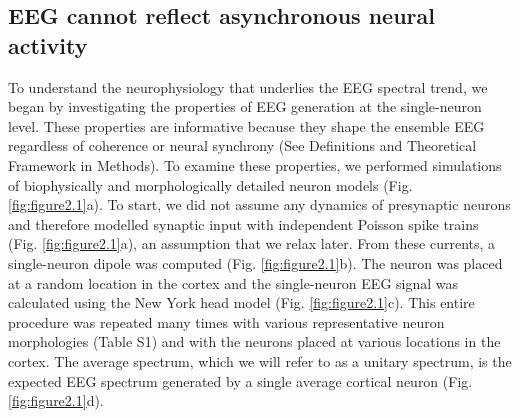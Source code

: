 \subsection{EEG cannot reflect asynchronous neural activity}
To understand the neurophysiology that underlies the EEG spectral trend, we began by investigating the properties of EEG generation at the single-neuron level. These properties are informative because they shape the ensemble EEG regardless of coherence or neural synchrony (See Definitions and Theoretical Framework in Methods). To examine these properties, we performed simulations of biophysically and morphologically detailed neuron models (Fig. \ref{fig:figure2.1}a). To start, we did not assume any dynamics of presynaptic neurons and therefore modelled synaptic input with independent Poisson spike trains (Fig. \ref{fig:figure2.1}a), an assumption that we relax later. From these currents, a single-neuron dipole was computed\cite{Næss2021} (Fig. \ref{fig:figure2.1}b). The neuron was placed at a random location in the cortex and the single-neuron EEG signal was calculated using the New York head model\cite{Huang2016} (Fig. \ref{fig:figure2.1}c). This entire procedure was repeated many times with various representative neuron morphologies (Table S1) and with the neurons placed at various locations in the cortex. The average spectrum, which we will refer to as a unitary spectrum, is the expected EEG spectrum generated by a single average cortical neuron (Fig. \ref{fig:figure2.1}d). 

